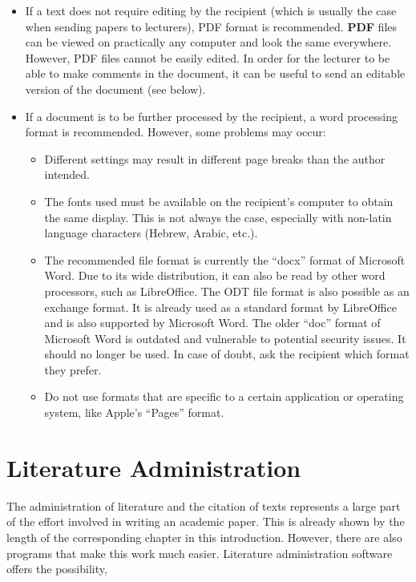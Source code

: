 \documentclass[
  english,
]{scrreprt}
\begin{document}
\begin{itemize}
\item
  If a text does not require editing by the recipient (which is usually the case when sending papers to lecturers), PDF format is recommended. \textbf{PDF} files can be viewed on practically any computer and look the same everywhere. However, PDF files cannot be easily edited. In order for the lecturer to be able to make comments in the document, it can be useful to send an editable version of the document (see below).
\item
  If a document is to be further processed by the recipient, a word processing format is recommended. However, some problems may occur:

  \begin{itemize}
  \item
    Different settings may result in different page breaks than the author intended.
  \item
    The fonts used must be available on the recipient’s computer to obtain the same display. This is not always the case, especially with non-latin language characters (Hebrew, Arabic, etc.).
  \item
    The recommended file format is currently the “docx” format of Microsoft Word. Due to its wide distribution, it can also be read by other word processors, such as LibreOffice. The ODT file format is also possible as an exchange format. It is already used as a standard format by LibreOffice and is also supported by Microsoft Word. The older “doc” format of Microsoft Word is outdated and vulnerable to potential security issues. It should no longer be used. In case of doubt, ask the recipient which format they prefer.
  \item
    Do not use formats that are specific to a certain application or operating system, like Apple’s “Pages” format.
  \end{itemize}
\end{itemize}

\chapter{Literature Administration}\label{sec:literature_administration}

The administration of literature and the citation of texts represents a large part of the effort involved in writing an academic paper. This is already shown by the length of the corresponding chapter in this introduction. However, there are also programs that make this work much easier. Literature administration software offers the possibility,
\end{document}
